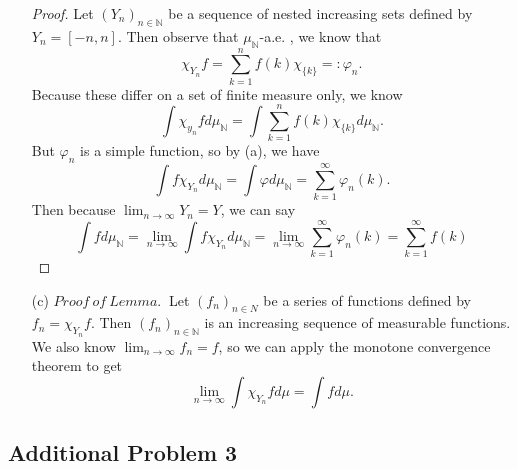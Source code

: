 \documentclass[12pt]{article}
\def\N{\mathbb{N}}
\begin{document}
\begin{itemize}
    \begin{proof}
        Let $(Y_n)_{n \in \N}$ be a sequence of nested increasing sets defined by $Y_n = [-n, n]$.
        Then observe that $\mu_\N$-a.e. , we know that $$\chi_{Y_n} f = \sum_{k=1}^{n} f(k) \chi_{\{k\}} =: \varphi_n.$$ Because these differ on a set of finite measure only, we know $$\int \chi_{y_n} f d \mu_\N = \int \sum_{k=1}^{n} f(k) \chi_{\{k\}} d \mu_\N.$$ But $\varphi_n$ is a simple function, so by (a), we have $$\int f \chi_{Y_n} d \mu_\N = \int \varphi d \mu_\N = \sum_{k=1}^\infty \varphi_n (k).$$ Then because $\lim_{n \to \infty} Y_n = Y$, we can say $$\int f d \mu_\N = \lim_{n \to \infty} \int f \chi_{Y_n} d \mu_\N = \lim_{n \to \infty} \sum_{k=1}^{\infty} \varphi_n (k) = \sum_{k=1}^{\infty} f(k)$$
    \end{proof}
    \item[(c)]
    $Proof~of~Lemma.~$ Let $(f_n)_{n \in N}$ be a series of functions defined by $f_n = \chi_{Y_n} f$. Then $(f_n)_{n \in \N}$ is an increasing sequence of measurable functions. We also know $\lim_{n \to \infty} f_n = f$, so we can apply the monotone convergence theorem to get $$ \lim_{n \to \infty} \int \chi_{Y_n} f d \mu = \int f d \mu.$$
\end{itemize}

\subsection*{Additional Problem 3}
\end{document}
